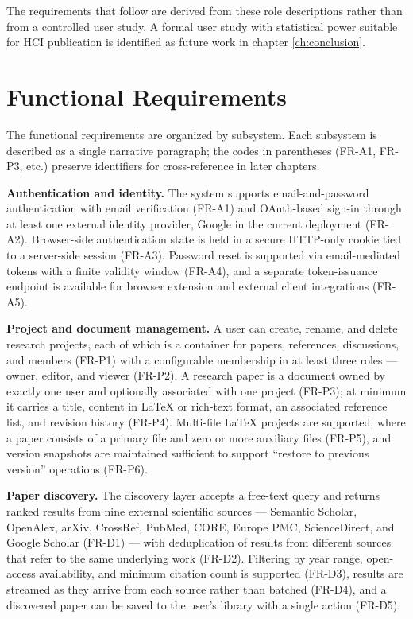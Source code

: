 The requirements that follow are derived from these role descriptions rather than from a controlled user study. A formal user study with statistical power suitable for HCI publication is identified as future work in chapter \ref{ch:conclusion}.

\section{Functional Requirements}
\label{sec:req-functional}

The functional requirements are organized by subsystem. Each subsystem is described as a single narrative paragraph; the codes in parentheses (FR-A1, FR-P3, etc.) preserve identifiers for cross-reference in later chapters.

\textbf{Authentication and identity.} The system supports email-and-password authentication with email verification (FR-A1) and OAuth-based sign-in through at least one external identity provider, Google in the current deployment (FR-A2). Browser-side authentication state is held in a secure HTTP-only cookie tied to a server-side session (FR-A3). Password reset is supported via email-mediated tokens with a finite validity window (FR-A4), and a separate token-issuance endpoint is available for browser extension and external client integrations (FR-A5).

\textbf{Project and document management.} A user can create, rename, and delete research projects, each of which is a container for papers, references, discussions, and members (FR-P1) with a configurable membership in at least three roles --- owner, editor, and viewer (FR-P2). A research paper is a document owned by exactly one user and optionally associated with one project (FR-P3); at minimum it carries a title, content in LaTeX or rich-text format, an associated reference list, and revision history (FR-P4). Multi-file LaTeX projects are supported, where a paper consists of a primary file and zero or more auxiliary files (FR-P5), and version snapshots are maintained sufficient to support ``restore to previous version'' operations (FR-P6).

\textbf{Paper discovery.} The discovery layer accepts a free-text query and returns ranked results from nine external scientific sources --- Semantic Scholar, OpenAlex, arXiv, CrossRef, PubMed, CORE, Europe PMC, ScienceDirect, and Google Scholar (FR-D1) --- with deduplication of results from different sources that refer to the same underlying work (FR-D2). Filtering by year range, open-access availability, and minimum citation count is supported (FR-D3), results are streamed as they arrive from each source rather than batched (FR-D4), and a discovered paper can be saved to the user's library with a single action (FR-D5).

